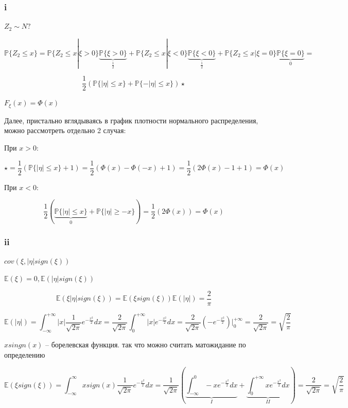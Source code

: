 \documentclass[a4paper,12pt]{article}
\def \mbb{\mathbb}
\def \P{\mbb{P}}
\def \E{\mbb{E}}
\begin{document}
\subsubsection{i}
$ Z_2 \sim N? $

\[ \P\{ Z_2 \le x \} = \P\{ Z_2 \le x | \xi > 0 \} \underbrace{\P\{ \xi > 0 \}}_{\frac{1}{2}} +  \P\{ Z_2 \le x | \xi < 0 \}\underbrace{ \P\{ \xi < 0 \} }_{\frac{1}{2}}+  \P\{ Z_2 \le x | \xi = 0 \} \underbrace{\P\{ \xi = 0 \}}_0 = \]

\[ \frac{1}{2} (\P\{ |\eta| \le x \} + \P\{ -|\eta| \le x \}) \star \]

$ F_{\xi}(x) = \Phi(x) $

Далее, пристально вглядываясь в график плотности нормального распределения, можно рассмотреть отдельно 2 случая:


При  $ x > 0  $:



\[ \star = \frac{1}{2}(\P\{ |\eta| \le x \} + 1) =  \frac{1}{2}(\Phi(x) - \Phi(-x) + 1) = \frac{1}{2}(2\Phi(x) - 1 + 1) = \Phi(x)\]


При $ x < 0 $:

\[ \frac{1}{2} (\underbrace{\P\{ |\eta| \le x \} }_0+ \P\{ |\eta| \ge -x \}) = \frac{1}{2}(2 \Phi(x)) = \Phi(x)\]




\subsubsection{ii}

$ cov(\xi, |\eta| sign(\xi)) $

$ \E(\xi) = 0, \E(|\eta| sign(\xi)) $

\[ \E(\xi |\eta| sign(\xi)) = \E(\xi sign(\xi)) \E(|\eta|) = \frac{2}{\pi}\]

\[ \E(|\eta|) = \int_{-\infty}^{+\infty} |x| \frac{1}{\sqrt{2\pi}} e^{-\frac{x^2}{2}} dx =  \frac{2}{\sqrt{2\pi}} \int_{0}^{+\infty} |x| e^{-\frac{x^2}{2}} dx =  \frac{2}{\sqrt{2\pi}}  \left( -e^{-\frac{x^2}{2}} \right) \Biggr|_0^{+\infty} = \frac{2}{\sqrt{2\pi}} = \sqrt{\frac{2}{\pi}}\]


$ xsingn(x)  $ -- борелевская функция. так что можно считать матожидание по определению

 \[ \E(\xi sign(\xi)) =\int_{-\infty}^{\infty}  x sign(x) \frac{1}{\sqrt{2\pi}} e^{-\frac{x^2}{2}} dx  =  \frac{1}{\sqrt{2\pi}} \left( \underbrace{ \int_{-\infty}^{0} -x e^{-\frac{x^2}{2}} dx }_I + \underbrace{ \int_{0}^{+\infty} x e^{-\frac{x^2}{2}} dx }_{II}  \right) = \frac{2}{\sqrt{2\pi}} = \sqrt{\frac{2}{\pi}} \]
\end{document}
